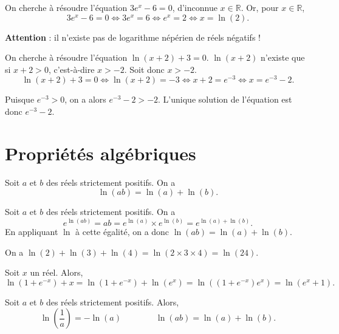 \documentclass[11pt,fleqn, openany]{book} %
\begin{document}
\begin{example}On cherche à résoudre l'équation $3e^x-6=0$, d'inconnue $x\in \mathbb{R}$. Or, pour $x\in \mathbb{R}$,
\[ 3e^x-6=0 \Leftrightarrow 3e^x=6 \Leftrightarrow e^x=2 \Leftrightarrow x = \ln (2). \]\end{example}


\textbf{Attention} : il n'existe pas de logarithme népérien de réels négatifs !

\begin{example}On cherche à résoudre l'équation $\ln(x+2)+3=0$. $\ln(x+2)$ n'existe que si $x+2>0$, c'est-à-dire $x>-2$. Soit donc $x>-2$. 
\[\ln(x+2)+3=0 \Leftrightarrow \ln(x+2)=-3 \Leftrightarrow x+2 =e^{-3} \Leftrightarrow x =e^{-3}-2.\]

Puisque $e^{-3}>0$, on a alors $e^{-3}-2>-2$. L'unique solution de l'équation est donc $e^{-3}-2$.
\end{example}
\newpage

\section{Propriétés algébriques}

\begin{proposition}Soit $a$ et $b$ des réels strictement positifs. On a
\[\ln (ab)=\ln(a)+\ln (b).\]\vspace{-0.5cm}\end{proposition}

\begin{demonstration}
Soit $a$ et $b$ des réels strictement positifs. On a
\[e^{\ln(ab)}=ab=e^{\ln(a)} \times e^{\ln (b)} = e^{\ln(a) + \ln(b)}.\] 
En appliquant $\ln$ à cette égalité, on a donc $\ln(ab)=\ln(a) + \ln(b)$.
\end{demonstration}

\begin{example}On a $\ln(2)+\ln(3)+\ln(4)=\ln(2\times 3 \times 4)=\ln(24)$.\end{example}

\begin{example}Soit $x$ un réel. Alors,
\[\ln(1+e^{-x})+x= \ln(1+e^{-x})+\ln(e^x)=\ln((1+e^{-x})e^x)=\ln(e^x+1).\]\end{example}

\begin{proposition}Soit $a$ et $b$ des réels strictement positifs. Alors,
\[\ln\left(\dfrac{1}{a}\right)=-\ln(a) \qquad \qquad \ln (ab)=\ln(a)+\ln (b).\]\vspace{-0.5cm}\end{proposition}
\end{document}
